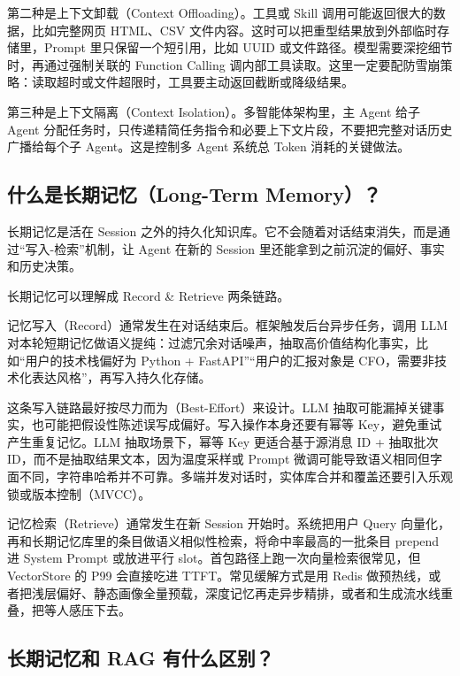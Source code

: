 \documentclass[10pt,a4paper]{ctexart}
\begin{document}
第二种是上下文卸载（Context Offloading）。工具或 Skill 调用可能返回很大的数据，比如完整网页 HTML、CSV 文件内容。这时可以把重型结果放到外部临时存储里，Prompt 里只保留一个短引用，比如 UUID 或文件路径。模型需要深挖细节时，再通过强制关联的 Function Calling 调内部工具读取。这里一定要配防雪崩策略：读取超时或文件超限时，工具要主动返回截断或降级结果。



第三种是上下文隔离（Context Isolation）。多智能体架构里，主 Agent 给子 Agent 分配任务时，只传递精简任务指令和必要上下文片段，不要把完整对话历史广播给每个子 Agent。这是控制多 Agent 系统总 Token 消耗的关键做法。



\subsection{什么是长期记忆（Long-Term Memory）？}


长期记忆是活在 Session 之外的持久化知识库。它不会随着对话结束消失，而是通过“写入-检索”机制，让 Agent 在新的 Session 里还能拿到之前沉淀的偏好、事实和历史决策。



长期记忆可以理解成 Record \& Retrieve 两条链路。



记忆写入（Record）通常发生在对话结束后。框架触发后台异步任务，调用 LLM 对本轮短期记忆做语义提纯：过滤冗余对话噪声，抽取高价值结构化事实，比如“用户的技术栈偏好为 Python + FastAPI”“用户的汇报对象是 CFO，需要非技术化表达风格”，再写入持久化存储。



这条写入链路最好按尽力而为（Best-Effort）来设计。LLM 抽取可能漏掉关键事实，也可能把假设性陈述误写成偏好。写入操作本身还要有幂等 Key，避免重试产生重复记忆。LLM 抽取场景下，幂等 Key 更适合基于源消息 ID + 抽取批次 ID，而不是抽取结果文本，因为温度采样或 Prompt 微调可能导致语义相同但字面不同，字符串哈希并不可靠。多端并发对话时，实体库合并和覆盖还要引入乐观锁或版本控制（MVCC）。



记忆检索（Retrieve）通常发生在新 Session 开始时。系统把用户 Query 向量化，再和长期记忆库里的条目做语义相似性检索，将命中率最高的一批条目 prepend 进 System Prompt 或放进平行 slot。首包路径上跑一次向量检索很常见，但 VectorStore 的 P99 会直接吃进 TTFT。常见缓解方式是用 Redis 做预热线，或者把浅层偏好、静态画像全量预载，深度记忆再走异步精排，或者和生成流水线重叠，把等人感压下去。



\subsection{长期记忆和 RAG 有什么区别？}
\end{document}

